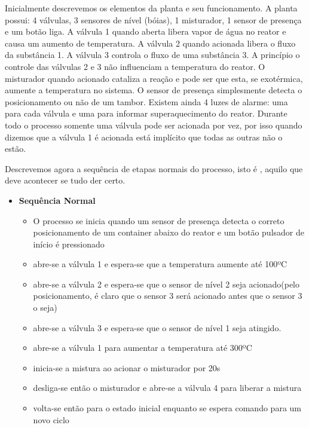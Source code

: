 Inicialmente descrevemos os elementos da planta e seu funcionamento. A planta possui: 4 válvulas, 3 sensores de nível (bóias),
1 misturador, 1 sensor de presença e um botão liga. A válvula 1 quando aberta libera vapor de água no reator e causa um aumento
de temperatura. A válvula 2 quando acionada libera o fluxo da substância 1. A válvula 3 controla o fluxo de uma substância 3.
A princípio o controle das válvulas 2  e  3 não influenciam a temperatura do reator. O misturador quando acionado cataliza a reação
e pode ser que esta, se exotérmica, aumente a temperatura no sistema. O sensor de presença simplesmente detecta o posicionamento ou 
não de um tambor. Existem ainda 4 luzes de alarme: uma para cada válvula e uma para informar superaquecimento do reator. Durante
todo o processo somente uma válvula pode ser acionada por vez, por isso quando dizemos que a válvula 1 é acionada está implícito
que todas as outras não o estão.


Descrevemos agora a sequência de etapas normais do processo, isto é , aquilo que deve acontecer se tudo der certo. 


\begin{itemize}
	\item \textbf{Sequência Normal}
	\begin{itemize}
		\item O processo se inicia quando um sensor de presença detecta o correto posicionamento de um container abaixo
		do reator e um botão pulsador de início é pressionado
		\item abre-se a válvula 1 e espera-se que a temperatura aumente até 100ºC
		\item abre-se a válvula 2 e espera-se que o sensor de nível 2 seja acionado(pelo posicionamento, é claro que
		o  sensor 3 será acionado antes que o sensor 3 o seja)
		\item abre-se a válvula 3 e espera-se que o sensor de nível 1 seja atingido.
		\item abre-se a válvula 1 para aumentar a temperatura até 300ºC
		\item inicia-se a mistura ao acionar o misturador por 20s
		\item desliga-se então o misturador e abre-se a válvula 4 para liberar a mistura
		\item volta-se então para o estado inicial enquanto se espera comando para um novo ciclo
	\end{itemize}
\end{itemize}

